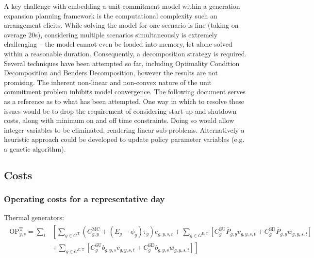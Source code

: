 \documentclass{article}
\newcommand{\sGeneratorsExistingThermal}{G^{\mathrm{E,T}}}
\newcommand{\sGeneratorsCandidateThermal}{G^{\mathrm{C,T}}}
\newcommand{\sGeneratorsThermal}{G^{\mathrm{T}}}
\newcommand{\iGenerator}{g}
\newcommand{\iYear}{y}
\newcommand{\iScenario}{s}
\newcommand{\iInterval}{t}
\newcommand{\cOperatingCostThermal}[1][\iYear,\iScenario]{\mathrm{OP}^{\mathrm{T}}_{#1}}
\newcommand{\cMarginalCost}[1][\iGenerator,\iYear]{C^{\mathrm{MC}}_{#1}}
\newcommand{\cStartupCost}[1][\iGenerator]{C^{\mathrm{SU}}_{#1}}
\newcommand{\cShutdownCost}[1][\iGenerator]{C^{\mathrm{SD}}_{#1}}
\newcommand{\cEmissionsIntensity}[1][\iGenerator]{E_{#1}}
\newcommand{\cPowerOutputMax}[1][\iGenerator,\iYear]{\overline{P}_{#1}}
\newcommand{\vBaseline}[1][\iYear]{\phi_{#1}}
\newcommand{\vPermitPrice}[1][\iYear]{\tau_{#1}}
\newcommand{\vEnergy}[1][\iGenerator,\iYear,\iScenario,\iInterval]{e_{#1}}
\newcommand{\vStartupIndicator}[1][\iGenerator,\iYear,\iScenario,\iInterval]{v_{#1}}
\newcommand{\vShutdownIndicator}[1][\iGenerator,\iYear,\iScenario,\iInterval]{w_{#1}}
\newcommand{\vInstalledCapacityTotalScenario}[1][\iGenerator,\iYear,\iScenario]{b_{#1}}
\begin{document}
A key challenge with embedding a unit commitment model within a generation expansion planning framework is the computational complexity such an arrangement elicits. While solving the model for one scenario is fine (taking on average 20s), considering multiple scenarios simultaneously is extremely challenging -- the model cannot even be loaded into memory, let alone solved within a reasonable duration. Consequently, a decomposition strategy is required. Several techniques have been attempted so far, including Optimality Condition Decomposition and Benders Decomposition, however the results are not promising. The inherent non-linear and non-convex nature of the unit commitment problem inhibits model convergence. The following document serves as a reference as to what has been attempted. One way in which to resolve these issues would be to drop the requirement of considering start-up and shutdown costs, along with minimum on and off time constraints. Doing so would allow integer variables to be eliminated, rendering linear sub-problems. Alternatively a heuristic approach could be developed to update policy parameter variables (e.g. a genetic algorithm).

\subsection{Costs}
\subsubsection{Operating costs for a representative day}
Thermal generators:
\begin{align}
\begin{split}
\cOperatingCostThermal = \sum\limits_{\iInterval} & \left[\sum\limits_{\iGenerator \in \sGeneratorsThermal} (\cMarginalCost + (\cEmissionsIntensity - \vBaseline)\vPermitPrice)\vEnergy + \sum\limits_{\iGenerator \in \sGeneratorsExistingThermal} \left[\cStartupCost \cPowerOutputMax \vStartupIndicator + \cShutdownCost \cPowerOutputMax \vShutdownIndicator\right] \right.\\
& \left. + \sum\limits_{\iGenerator \in \sGeneratorsCandidateThermal} \left[\cStartupCost \vInstalledCapacityTotalScenario \vStartupIndicator + \cShutdownCost \vInstalledCapacityTotalScenario \vShutdownIndicator\right] \right]\\
\end{split}
\label{eqn: total thermal generator operating cost}
\end{align}
\end{document}
